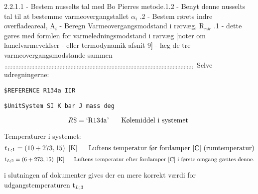 \documentclass[../Hovedrapport.tex]{subfiles}
\newcommand{\SC}[1]{\mbox{`#1'}\  }
\newcommand{\I}{\mbox{\hspace{0.20in}}}
\begin{document}
	                  2.2.1.1 - Bestem nusselts tal med Bo Pierres metode.1.2 - Benyt denne nusselts tal til at bestemme varmeovergangstallet $\alpha$$_{i}$\newline
	 .2 - Bestem rørets indre overfladeareal, A$_{i}$\newline
 \newline
  - Beregn Varmeovergangsmodstand i rørvæg, R$_{rør}$\newline
 .1 - dette gøres med formlen for varmeledningsmodstand i rørvæg [noter om lamelvarmeveklser - eller termodynamik afsnit 9]\newline
  - læg de tre varmeovergangsmodstande sammen\newline
 \newline
$_{;;;;;;;;;;;;;;;;;;;;;;;;;;;;;;;;;;;;;;;;;;;;;;;;;;;;;;;;;;;;;;;;;;;;;;;;;;;;;;;;;;;;;;;;;;;;;;;;;;;;;;;;;;;;;;;;;;;;;;;;\newline}$
 \newline
Selve udregningerne:
\begin{verbatim}
$REFERENCE R134a IIR
\end{verbatim}  \begin{verbatim}
$UnitSystem SI K bar J mass deg
\end{verbatim}  \begin{equation}
\label{EES Eqn:1}
R\$ = \SC{R134a}		 
\mbox{\I Kølemiddel i systemet }
\end{equation}

\vspace{0.10in}
\noindent
\rm Temperaturer i systemet:
\begin{equation}
\label{EES Eqn:2}
t_{L;1} =  \left( 10 + 273,15 \right)    \   \left[ \rm K \right]	 
\mbox{\I Luftens temperatur før fordamper [C] (rumtemperatur)}
\end{equation}
\begin{equation}
\label{EES Eqn:3}
t_{L;2} =  \left( 6 + 273,15 \right)    \   \left[ \rm K \right]	 
\mbox{\I Luftens temperatur efter fordamper [C] i første omgang gættes denne.}
\end{equation}

\vspace{0.10in}
\noindent
\rm i slutningen af dokumenter gives der en mere korrekt værdi for udgangstemperaturen t$_{L;3}$
\end{document}
